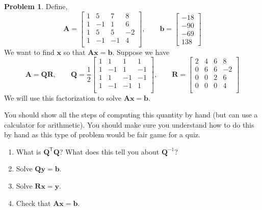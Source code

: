 \documentclass[12pt]{article}
\theoremstyle{definition}
\newtheorem{problem}{Problem}
\renewcommand{\vec}{\mathbf}
\newcommand{\T}{\mathsf{T}}
\begin{document}
    \clearpage
    \begin{problem}
    Define,
    \begin{equation*}
        \vec{A} =
        \begin{bmatrix}
     1 & 5 & 7 & 8 \\
     1 & -1 & 1 & 6 \\
     1 & 5 & 5 & -2 \\
     1 & -1 & -1 & 4 \\
        \end{bmatrix}
        ,\qquad
        \vec{b} = 
        \begin{bmatrix}-18\\-90\\-69\\138\end{bmatrix}
        \end{equation*}
        We want to find $\vec{x}$ so that $\vec{A}\vec{x} = \vec{b}$.
        Suppose we have
        \[
        \vec{A} = \vec{Q}\vec{R},\qquad
        \vec{Q} = 
        \frac{1}{2}\begin{bmatrix}
     1 & 1 & 1 & 1 \\
     1 & -1 & 1 & -1 \\
     1 & 1 & -1 & -1 \\
     1 & -1 & -1 & 1 \\
        \end{bmatrix}
        ,\qquad
        \vec{R} = 
        \begin{bmatrix}
     2 & 4 & 6 & 8 \\
     0 & 6 & 6 & -2 \\
     0 & 0 & 2 & 6 \\
     0 & 0 & 0 & 4 \\
        \end{bmatrix}
        \]
        We will use this factorization to solve $\vec{A} \vec{x} = \vec{b}$.

        You should show all the steps of computing this quantity by hand (but can use a calculator for arithmetic). You should make sure you understand how to do this by hand as this type of problem would be fair game for a quiz.

        \begin{enumerate}
            \item 
            What is $\vec{Q}^\T \vec{Q}$? What does this tell you about $\vec{Q}^{-1}$?
            \item Solve $\vec{Q}\vec{y} = \vec{b}$.
            \item Solve $\vec{R}\vec{x} = \vec{y}$.
            \item Check that $\vec{A}\vec{x} = \vec{b}$.
        \end{enumerate}

    \end{problem}
\end{document}
